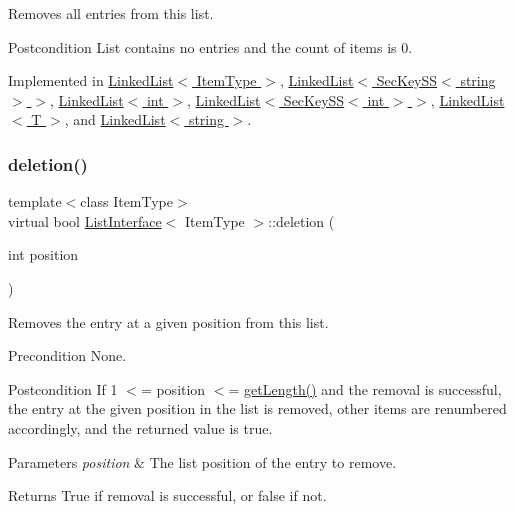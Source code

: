 Removes all entries from this list. \begin{DoxyPostcond}{Postcondition}
List contains no entries and the count of items is 0. 
\end{DoxyPostcond}


Implemented in \hyperlink{classLinkedList_a7d1d9cf83eef67b6c4d700a3cc5970e1}{Linked\+List$<$ Item\+Type $>$}, \hyperlink{classLinkedList_a7d1d9cf83eef67b6c4d700a3cc5970e1}{Linked\+List$<$ Sec\+Key\+S\+S$<$ string $>$ $>$}, \hyperlink{classLinkedList_a7d1d9cf83eef67b6c4d700a3cc5970e1}{Linked\+List$<$ int $>$}, \hyperlink{classLinkedList_a7d1d9cf83eef67b6c4d700a3cc5970e1}{Linked\+List$<$ Sec\+Key\+S\+S$<$ int $>$ $>$}, \hyperlink{classLinkedList_a7d1d9cf83eef67b6c4d700a3cc5970e1}{Linked\+List$<$ T $>$}, and \hyperlink{classLinkedList_a7d1d9cf83eef67b6c4d700a3cc5970e1}{Linked\+List$<$ string $>$}.

\mbox{\label{classListInterface_a68520ce2942ec716c745b1137c50a3c6}} 
\subsubsection{\texorpdfstring{deletion()}{deletion()}}
{\footnotesize\ttfamily template$<$class Item\+Type$>$ \\
virtual bool \hyperlink{classListInterface}{List\+Interface}$<$ Item\+Type $>$\+::deletion (\begin{DoxyParamCaption}\item[{int}]{position }\end{DoxyParamCaption})\hspace{0.3cm}{\ttfamily [pure virtual]}}

Removes the entry at a given position from this list. \begin{DoxyPrecond}{Precondition}
None. 
\end{DoxyPrecond}
\begin{DoxyPostcond}{Postcondition}
If 1 $<$= position $<$= \hyperlink{classListInterface_afc85695d4137f1e29ff02e179c9f3221}{get\+Length()} and the removal is successful, the entry at the given position in the list is removed, other items are renumbered accordingly, and the returned value is true. 
\end{DoxyPostcond}

\begin{DoxyParams}{Parameters}
{\em position} & The list position of the entry to remove. \\
\hline
\end{DoxyParams}
\begin{DoxyReturn}{Returns}
True if removal is successful, or false if not. 
\end{DoxyReturn}


